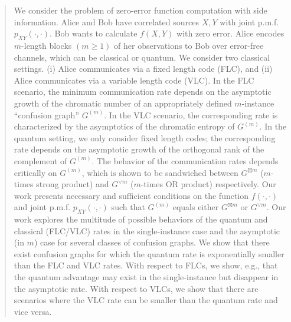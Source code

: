\documentclass[journal, onecolumn, draftcls]{IEEEtran}
\theoremstyle{definition}
\newcommand{\meng}[1]{\marginpar{+}{\bf Ruoyu's remark}: {\em #1}}
\newcommand{\aditya}[1]{\marginpar{+}{\bf Aditya's remark}: {\em #1}}
\begin{document}
\begin{abstract} 
We consider the problem of zero-error function computation with side information. Alice and Bob have correlated sources $X,Y$ with joint p.m.f. $p_{XY}(\cdot, \cdot)$. Bob wants to calculate $f(X,Y)$ with zero error. Alice encodes $m$-length blocks $(m \geq 1)$ of her observations to Bob over error-free channels, which can be classical or quantum. 
We consider two classical settings. (i) Alice communicates via a fixed length code (FLC), and (ii) Alice communicates via a variable length code (VLC). In the FLC scenario, the minimum communication rate depends on the asymptotic growth of the chromatic number of an appropriately defined $m$-instance ``confusion graph'' $G^{(m)}$. In the VLC scenario, the corresponding rate is characterized by the asymptotics of the chromatic entropy of $G^{(m)}$.
In the quantum setting, we only consider fixed length codes; the corresponding rate depends on the asymptotic growth of the orthogonal rank of the complement of $G^{(m)}$.  The behavior of the communication rates depends critically on $G^{(m)}$, which is shown to be sandwiched between $G^{\boxtimes m}$ ($m$-times strong product) and $G^{\lor m}$ ($m$-times OR product) respectively. Our work presents necessary and sufficient conditions on the function $f(\cdot, \cdot)$ and joint p.m.f. $p_{XY}(\cdot,\cdot)$ such that $G^{(m)}$ equals either $G^{\boxtimes m}$  or $G^{\lor m}$.  Our work explores the multitude of possible behaviors of the quantum and classical (FLC/VLC) rates in the single-instance case and the asymptotic (in $m$) case for several classes of confusion graphs. We show that there exist confusion graphs for which the quantum rate is exponentially smaller than the FLC and VLC rates.  With respect to FLCs, we show, e.g., that the quantum advantage may exist in the single-instance but disappear in the asymptotic rate. With respect to VLCs, we show that there are scenarios where the VLC rate can be smaller than the quantum rate and vice versa. %






\end{abstract}
\end{document}

